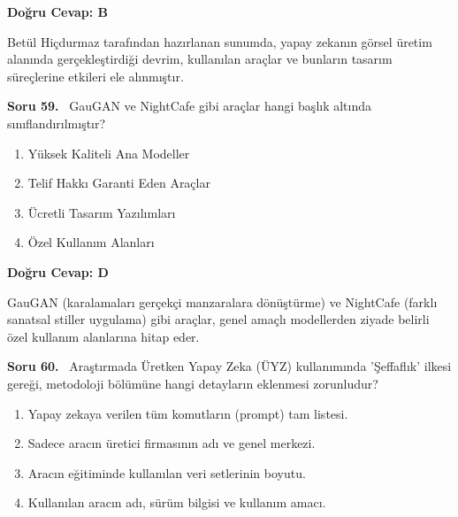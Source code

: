 \documentclass[11pt,a4paper,openany]{book}
\begin{document}
\vspace{4pt}
\begin{tcolorbox}[title=Cevap ve Açıklama, colback=gray!3!white, colframe=primarycolor!90!black, arc=2mm, fonttitle=\bfseries\sffamily, top=6pt, bottom=6pt]
    \textbf{Doğru Cevap: B}

    \vspace{2pt}
    Betül Hiçdurmaz tarafından hazırlanan sunumda, yapay zekanın görsel üretim alanında gerçekleştirdiği devrim, kullanılan araçlar ve bunların tasarım süreçlerine etkileri ele alınmıştır.
\end{tcolorbox}
\vspace{10pt}
\needspace{5cm}
\vspace{8pt}
\noindent\textbf{\large\sffamily Soru 59.} \ GauGAN ve NightCafe gibi araçlar hangi başlık altında sınıflandırılmıştır?

\begin{enumerate}[label=\Alph*), leftmargin=25pt, topsep=4pt, itemsep=2pt]
        \item Yüksek Kaliteli Ana Modeller
        \item Telif Hakkı Garanti Eden Araçlar
        \item Ücretli Tasarım Yazılımları
        \item Özel Kullanım Alanları
\end{enumerate}

\vspace{4pt}
\begin{tcolorbox}[title=Cevap ve Açıklama, colback=gray!3!white, colframe=primarycolor!90!black, arc=2mm, fonttitle=\bfseries\sffamily, top=6pt, bottom=6pt]
    \textbf{Doğru Cevap: D}

    \vspace{2pt}
    GauGAN (karalamaları gerçekçi manzaralara dönüştürme) ve NightCafe (farklı sanatsal stiller uygulama) gibi araçlar, genel amaçlı modellerden ziyade belirli özel kullanım alanlarına hitap eder.
\end{tcolorbox}
\vspace{10pt}
\needspace{5cm}
\vspace{8pt}
\noindent\textbf{\large\sffamily Soru 60.} \ Araştırmada Üretken Yapay Zeka (ÜYZ) kullanımında 'Şeffaflık' ilkesi gereği, metodoloji bölümüne hangi detayların eklenmesi zorunludur?

\begin{enumerate}[label=\Alph*), leftmargin=25pt, topsep=4pt, itemsep=2pt]
        \item Yapay zekaya verilen tüm komutların (prompt) tam listesi.
        \item Sadece aracın üretici firmasının adı ve genel merkezi.
        \item Aracın eğitiminde kullanılan veri setlerinin boyutu.
        \item Kullanılan aracın adı, sürüm bilgisi ve kullanım amacı.
\end{enumerate}
\end{document}
